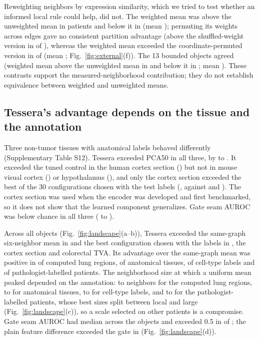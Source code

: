 \documentclass[11pt]{article}
\newcommand{\panelref}[2]{Fig.~\ref{#1}(#2)}
\begin{document}
Reweighting neighbors by expression similarity, which we tried to test whether an informed local rule could help, did not. The weighted mean was above the unweighted mean in \HerBndEUSixPos{} patients and below it in \HerBndEUSixNeg{} (mean \HerBndEUSixMean{}); permuting its weights across edges gave no consistent partition advantage (above the shuffled-weight version in \HerBndEShufPos{} of \HerPatients{}), whereas the weighted mean exceeded the coordinate-permuted version in \HerBndECoordPos{} of \HerPatients{} (mean \HerBndECoordMean{}; \panelref{fig:external}{f}). The 13 bounded objects agreed (weighted mean above the unweighted mean in \DevAllThirteenEMeanPos{} and below it in \DevAllThirteenEMeanNeg{}; mean \DevAllThirteenEMeanMean{}). These contrasts support the measured-neighborhood contribution; they do not establish equivalence between weighted and unweighted means.





\subsection{Tessera's advantage depends on the tissue and the annotation}
Three non-tumor tissues with anatomical labels behaved differently (Supplementary Table S12). Tessera exceeded PCA50 in all three, by \BrPcaGainMin{} to \BrPcaGainMax{}. It exceeded the tuned control in the human cortex section (\BrCortexTessNested{}) but not in mouse visual cortex (\BrStarmapTessNested{}) or hypothalamus (\BrMerfishTessNested{}), and only the cortex section exceeded the best of the 30 configurations chosen with the test labels (\BrCortexTessOracle{}, against \BrStarmapTessOracle{} and \BrMerfishTessOracle{}). The cortex section was used when the encoder was developed and first benchmarked, so it does not show that the learned component generalizes. Gate seam AUROC was below chance in all three (\BrGateMin{} to \BrGateMax{}).

Across all \LandN{} objects (\panelref{fig:landscape}{a--b}), Tessera exceeded the same-graph six-neighbor mean in \LandTessSamePos{} and the best configuration chosen with the labels in \LandTessOraclePos{}, the cortex section and colorectal TVA. Its advantage over the same-graph mean was positive in \LandComputedSamePos{} of \LandComputedN{} computed lung regions, \LandAnatSamePos{} of \LandAnatN{} anatomical tissues, \LandCellSamePos{} of \LandCellN{} cell-type labels and \LandPathSamePos{} of \LandPathN{} pathologist-labelled patients. The neighborhood size at which a uniform mean peaked depended on the annotation: \LandComputedKMin{} to \LandComputedKMax{} neighbors for the computed lung regions, \LandAnatKMin{} to \LandAnatKMax{} for anatomical tissues, \LandCellKMin{} to \LandCellKMax{} for cell-type labels, and \LandPathKMin{} to \LandPathKMax{} for the pathologist-labelled patients, whose best sizes split between local and large (\panelref{fig:landscape}{c}), so a scale selected on other patients is a compromise. Gate seam AUROC had median \LandGateMedian{} across the objects and exceeded 0.5 in \LandGateAbove{} of \LandN{}; the plain feature difference exceeded the gate in \LandRawOverGate{} (\panelref{fig:landscape}{d}).
\end{document}
